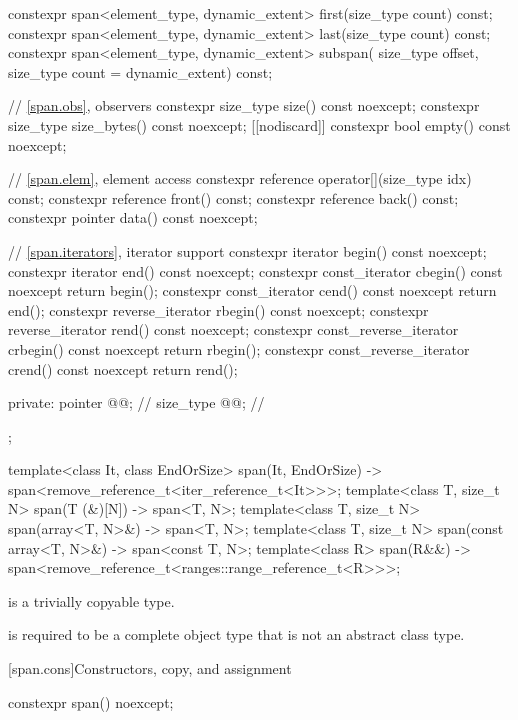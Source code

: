 \begin{codeblock}
{{    constexpr span<element_type, dynamic_extent> first(size_type count) const;
    constexpr span<element_type, dynamic_extent> last(size_type count) const;
    constexpr span<element_type, dynamic_extent> subspan(
      size_type offset, size_type count = dynamic_extent) const;

    // \ref{span.obs}, observers
    constexpr size_type size() const noexcept;
    constexpr size_type size_bytes() const noexcept;
    [[nodiscard]] constexpr bool empty() const noexcept;

    // \ref{span.elem}, element access
    constexpr reference operator[](size_type idx) const;
    constexpr reference front() const;
    constexpr reference back() const;
    constexpr pointer data() const noexcept;

    // \ref{span.iterators}, iterator support
    constexpr iterator begin() const noexcept;
    constexpr iterator end() const noexcept;
    constexpr const_iterator cbegin() const noexcept { return begin(); }
    constexpr const_iterator cend() const noexcept { return end(); }
    constexpr reverse_iterator rbegin() const noexcept;
    constexpr reverse_iterator rend() const noexcept;
    constexpr const_reverse_iterator crbegin() const noexcept { return rbegin(); }
    constexpr const_reverse_iterator crend() const noexcept { return rend(); }

  private:
    pointer @@;              // \expos
    size_type @@;            // \expos
  };

  template<class It, class EndOrSize>
    span(It, EndOrSize) -> span<remove_reference_t<iter_reference_t<It>>>;
  template<class T, size_t N>
    span(T (&)[N]) -> span<T, N>;
  template<class T, size_t N>
    span(array<T, N>&) -> span<T, N>;
  template<class T, size_t N>
    span(const array<T, N>&) -> span<const T, N>;
  template<class R>
    span(R&&) -> span<remove_reference_t<ranges::range_reference_t<R>>>;
}
\end{codeblock}

\pnum
{} is
a trivially copyable type.

\pnum
{} is required to be
a complete object type that is not an abstract class type.

[span.cons]{Constructors, copy, and assignment}

%
\begin{itemdecl}
constexpr span() noexcept;
\end{itemdecl}

